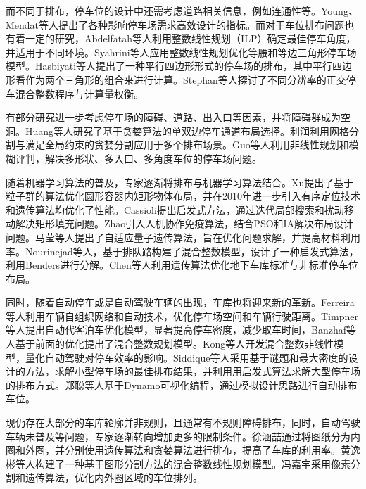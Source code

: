 而不同于排布，停车位的设计中还需考虑道路相关信息，例如连通性等。Young、Mendat\cite{young1988review, mendat2003perceptions}等人提出了各种影响停车场需求高效设计的指标。而对于车位排布问题也有着一定的研究，Abdelfatah\cite{abdelfatah2014parking}等人利用整数线性规划（ILP）确定最佳停车角度，并适用于不同环境。Syahrini\cite{syahrini2018mathematical}等人应用整数线性规划优化等腰和等边三角形停车场模型。Hasbiyati\cite{hasbiyati2019parking}等人提出了一种平行四边形形式的停车场的排布，其中平行四边形看作为两个三角形的组合来进行计算。Stephan\cite{stephan2021layout}等人探讨了不同分辨率的正交停车混合整数程序与计算量权衡。

有部分研究进一步考虑停车场的障碍、道路、出入口等因素，并将障碍群成为空洞。Huang\cite{huang2020general}等人研究了基于贪婪算法的单双边停车通道布局选择。利润\cite{1021546706.nh}利用网格分割与满足全局约束的贪婪分割应用于多个排布场景。Guo\cite{guo2022optimal}等人利用非线性规划和模糊评判，解决多形状、多入口、多角度车位的停车场问题。

随着机器学习算法的普及，专家逐渐将排布与机器学习算法结合。Xu\cite{xu2007particle}提出了基于粒子群的算法优化圆形容器内矩形物体布局，并在2010年\cite{xu2010genetic}进一步引入有序定位技术和遗传算法均优化了性能。Cassioli\cite{cassioli2010heuristic}提出启发式方法，通过迭代局部搜索和扰动移动解决矩形填充问题。Zhao\cite{zhao2014human}引入人机协作免疫算法，结合PSO和IA解决布局设计问题。马莹\cite{JSGG201820015}等人提出了自适应量子遗传算法，旨在优化问题求解，并提高材料利用率。Nourinejad\cite{nourinejad2018designing}等人，基于排队路构建了混合整数模型，设计了一种启发式算法，利用Benders进行分解。Chen\cite{chen2022arrangement}等人利用遗传算法优化地下车库标准与非标准停车位布局。

同时，随着自动停车或是自动驾驶车辆的出现，车库也将迎来新的革新。Ferreira\cite{ferreira2014self}等人利用车辆自组织网络和自动技术，优化停车场空间和车辆行驶距离。Timpner\cite{timpner2015k}等人提出自动代客泊车优化模型，显著提高停车密度，减少取车时间，Banzhaf\cite{banzhaf2017high}等人基于前面的优化提出了混合整数规划模型。Kong\cite{kong2018capacity}等人开发混合整数非线性模型，量化自动驾驶对停车效率的影响。Siddique\cite{siddique2021puzzle}等人采用基于谜题和最大密度的设计的方法，求解小型停车场的最佳排布结果，并利用用启发式算法求解大型停车场的排布方式。郑聪\cite{TMJZ202104021}等人基于Dynamo可视化编程，通过模拟设计思路进行自动排布车位。

现仍存在大部分的车库轮廓并非规则，且通常有不规则障碍排布，同时，自动驾驶车辆未普及等问题，专家逐渐转向增加更多的限制条件。徐涵喆\cite{1020726891.nh}通过将图纸分为内圈和外圈，并分别使用遗传算法和贪婪算法进行排布，提高了车库的利用率。黄逸彬等人\cite{BJYD202004002}构建了一种基于图形分割方法的混合整数线性规划模型。冯嘉宇\cite{1022674189.nh}采用像素分割和遗传算法，优化内外圈区域的车位排列。

